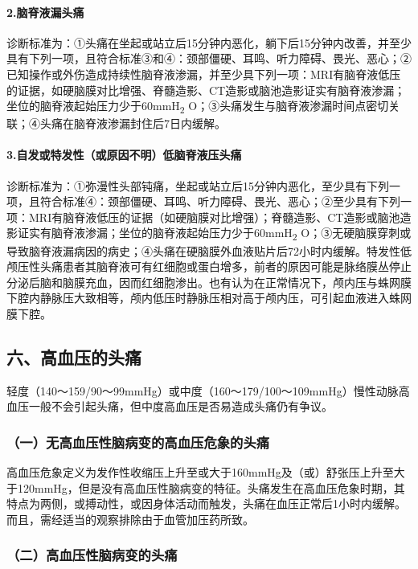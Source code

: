 \paragraph{2.脑脊液漏头痛}

诊断标准为：①头痛在坐起或站立后15分钟内恶化，躺下后15分钟内改善，并至少具有下列一项，且符合标准③和④：颈部僵硬、耳鸣、听力障碍、畏光、恶心；②已知操作或外伤造成持续性脑脊液渗漏，并至少具下列一项：MRI有脑脊液低压的证据，如硬脑膜对比增强、脊髓造影、CT造影或脑池造影证实有脑脊液渗漏；坐位的脑脊液起始压力少于60mmH\textsubscript{2}
O；③头痛发生与脑脊液渗漏时间点密切关联；④头痛在脑脊液渗漏封住后7日内缓解。

\paragraph{3.自发或特发性（或原因不明）低脑脊液压头痛}

诊断标准为：①弥漫性头部钝痛，坐起或站立后15分钟内恶化，至少具有下列一项，且符合标准④：颈部僵硬、耳鸣、听力障碍、畏光、恶心；②至少具有下列一项：MRI有脑脊液低压的证据（如硬脑膜对比增强）；脊髓造影、CT造影或脑池造影证实有脑脊液渗漏；坐位的脑脊液起始压力少于60mmH\textsubscript{2}
O；③无硬脑膜穿刺或导致脑脊液漏病因的病史；④头痛在硬脑膜外血液贴片后72小时内缓解。特发性低颅压性头痛患者其脑脊液可有红细胞或蛋白增多，前者的原因可能是脉络膜丛停止分泌后脑和脑膜充血，因而红细胞渗出。也有认为在正常情况下，颅内压与蛛网膜下腔内静脉压大致相等，颅内低压时静脉压相对高于颅内压，可引起血液进入蛛网膜下腔。

\subsection{六、高血压的头痛}

轻度（140～159/90～99mmHg）或中度（160～179/100～109mmHg）慢性动脉高血压一般不会引起头痛，但中度高血压是否易造成头痛仍有争议。

\subsubsection{（一）无高血压性脑病变的高血压危象的头痛}

高血压危象定义为发作性收缩压上升至或大于160mmHg及（或）舒张压上升至大于120mmHg，但是没有高血压性脑病变的特征。头痛发生在高血压危象时期，其特点为两侧，或搏动性，或因身体活动而触发，头痛在血压正常后1小时内缓解。而且，需经适当的观察排除由于血管加压药所致。

\subsubsection{（二）高血压性脑病变的头痛}

